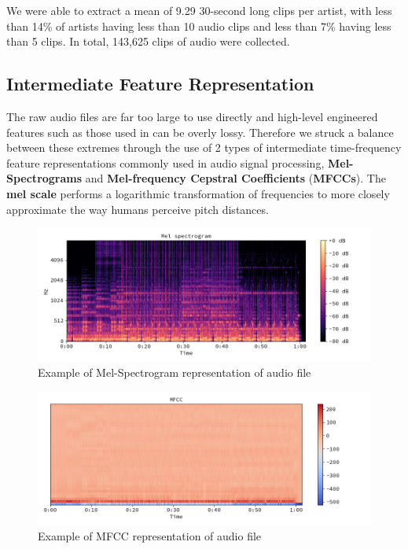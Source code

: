 We were able to extract a mean of 9.29 30-second long clips per artist, with less than 14\% of artists having less than 10 audio clips and less than 7\% having less than 5 clips. In total, 143,625 clips of audio were collected.

\subsection{Intermediate Feature Representation}
The raw audio files are far too large to use directly and high-level engineered features such as those used in \cite{shalit2013modeling} can be overly lossy. Therefore we struck a balance between these extremes through the use of 2 types of intermediate time-frequency feature representations commonly \cite{van2013deep} used in audio signal processing, \textbf{Mel-Spectrograms} and \textbf{Mel-frequency Cepstral Coefficients} (\textbf{MFCCs}). The \textbf{mel scale} performs a logarithmic transformation of frequencies to more closely approximate the way humans perceive pitch distances.

\begin{figure}[H]
\includegraphics[width=\textwidth]{figures/melspec.png}
\caption{Example of Mel-Spectrogram representation of audio file}
\end{figure}

\begin{figure}[H]
\includegraphics[width=\textwidth]{figures/mfcc.png}
\caption{Example of MFCC representation of audio file}
\end{figure}


